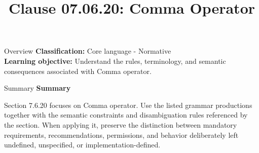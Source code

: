 \documentclass[10pt,letterpaper]{article}
\title{Clause 07.06.20: Comma Operator}
\author{}
\date{}
\begin{document}
\maketitle
\begin{CornellOverviewBox}{Overview}
\textbf{Classification:} Core language - Normative\\[2pt]
\textbf{Learning objective:} Understand the rules, terminology, and semantic consequences associated with Comma operator.
\end{CornellOverviewBox}\begin{CornellSummaryBox}{Summary}
{\sffamily\bfseries\color{Accent} Summary}\par\vspace{3pt}Section 7.6.20 focuses on Comma operator. Use the listed grammar productions together with the semantic constraints and disambiguation rules referenced by the section. When applying it, preserve the distinction between mandatory requirements, recommendations, permissions, and behavior deliberately left undefined, unspecified, or implementation-defined.
\end{CornellSummaryBox}
\end{document}
